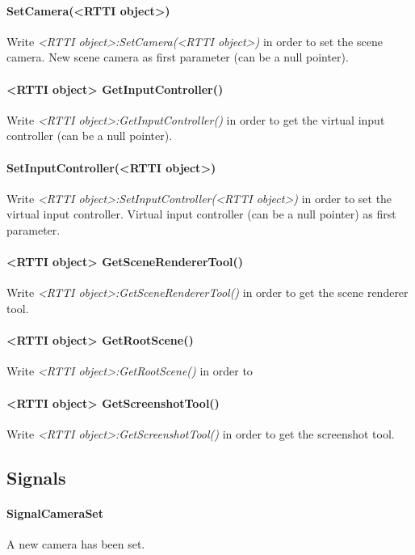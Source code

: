 \paragraph{SetCamera(<RTTI object>)}
Write \emph{<RTTI object>:SetCamera(<RTTI object>)} in order to set the scene camera. New scene camera as first parameter (can be a null pointer).

\paragraph{<RTTI object> GetInputController()}
Write \emph{<RTTI object>:GetInputController()} in order to get the virtual input controller (can be a null pointer).

\paragraph{SetInputController(<RTTI object>)}
Write \emph{<RTTI object>:SetInputController(<RTTI object>)} in order to set the virtual input controller. Virtual input controller (can be a null pointer) as first parameter.

\paragraph{<RTTI object> GetSceneRendererTool()}
Write \emph{<RTTI object>:GetSceneRendererTool()} in order to get the scene renderer tool.

\paragraph{<RTTI object> GetRootScene()}
Write \emph{<RTTI object>:GetRootScene()} in order to 

\paragraph{<RTTI object> GetScreenshotTool()}
Write \emph{<RTTI object>:GetScreenshotTool()} in order to get the screenshot tool.


\subsection{Signals}

\paragraph{SignalCameraSet}
A new camera has been set.

